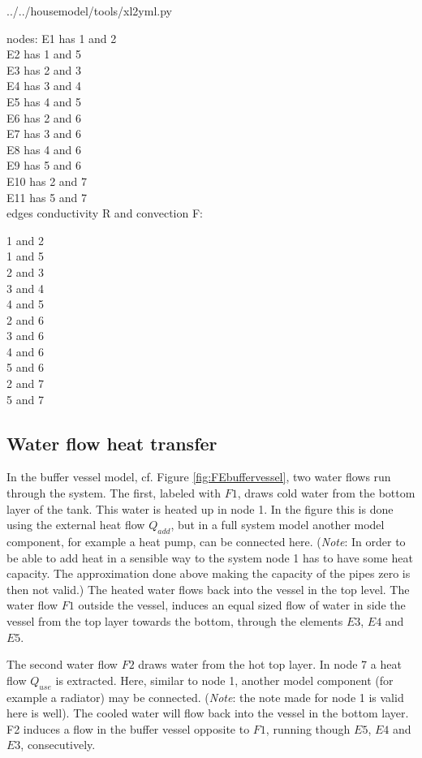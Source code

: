  
{../../housemodel/tools/xl2yml.py}
	
nodes:
E1 has 1 and 2\\
E2 has 1 and 5\\
E3 has 2 and 3\\
E4 has 3 and 4\\
E5 has 4 and 5\\
E6 has 2 and 6\\
E7 has 3 and 6\\
E8 has 4 and 6\\
E9 has 5 and 6\\
E10 has 2 and 7\\
E11 has 5 and 7\\

edges conductivity R and convection F:

1 and 2\\
1 and 5\\
2 and 3\\
3 and 4\\
4 and 5\\
2 and 6\\
3 and 6\\
4 and 6\\
5 and 6\\
2 and 7\\
5 and 7\\


\subsection{Water flow heat transfer}
In the buffer vessel model, cf. Figure \ref{fig:FEbuffervessel}, two water flows run through the system. The first, labeled with $F1$, draws cold water from the bottom layer of the tank. This water is heated up in node 1. In the figure this is done using the external heat flow $Q_{add}$, but in a full system model another model component, for example a heat pump, can be connected here. (\emph{Note}: In order to be able to add heat in a sensible way to the system node 1 has to have some heat capacity. The approximation done above making the capacity of the pipes zero is then not valid.) 
The heated water flows back into the vessel in the top level. The water flow $F1$ outside the vessel, induces an equal sized flow of water in side the vessel from the top layer towards the bottom, through the elements $E3$, $E4$ and $E5$. 

The second water flow $F2$ draws water from the hot top layer. In node 7 a heat flow $Q_{use}$ is extracted. Here, similar to node 1, another model component (for example a radiator) may be connected. (\emph{Note}: the note made for node 1 is valid here is well). 
The cooled water will flow back into the vessel in the bottom layer. F2 induces a flow in the buffer vessel opposite to $F1$, running though $E5$, $E4$ and $E3$,  consecutively. 

